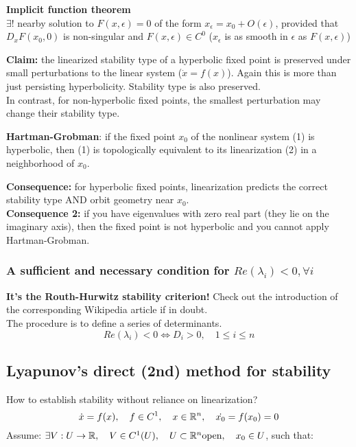  \begin{theorem}
 \textbf{Implicit function theorem}\\
 $\exists !$ nearby solution to $F(x,\epsilon)=0$ of the form  $x_{\epsilon}=x_0+O(\epsilon)$, provided that $D_xF(x_0, 0)$ is non-singular and $F(x,\epsilon)\in C^0$ ($x_{\epsilon}$ is as smooth in $\epsilon$ as $F(x,\epsilon)$) 
 \end{theorem}
 
 \textbf{Claim:} the linearized stability type of a hyperbolic fixed point is preserved under small perturbations to the linear system ($\dot{x}=f(x)$). Again this is more than just persisting hyperbolicity. Stability type is also preserved.\\
 In contrast, for non-hyperbolic fixed points, the smallest perturbation may change their stability type.
 
 \begin{theorem}
 \textbf{Hartman-Grobman}: if the fixed point $x_0$ of the nonlinear system (1) is hyperbolic, then (1) is topologically equivalent to its linearization (2) in a neighborhood of $x_0$.
 \end{theorem}
 \textbf{Consequence:} for hyperbolic fixed points, linearization predicts the correct stability type AND orbit geometry near $x_0$.\\
 
 \textbf{Consequence 2:} if you have eigenvalues with zero real part (they lie on the imaginary axis), then the fixed point is not hyperbolic and you cannot apply Hartman-Grobman.
 
 \subsubsection{A sufficient and necessary condition for $Re(\lambda_i) <0, \forall i$}
 \textbf{It's the Routh-Hurwitz stability criterion!} Check out the introduction of the corresponding Wikipedia article if in doubt.\\
 The procedure is to define a series of determinants.
 $$Re(\lambda_i)<0 \iff D_i>0, \quad 1\leq i\leq n$$
 
 \subsection{Lyapunov's direct (2nd) method for stability}

How to establish stability without reliance on linearization?
$$\dot{x}=f(x), \quad f\in C^1, \quad x \in \mathbb{R}^n, \quad \dot{x_0}=f(x_0)=0$$
Assume: $\exists V: U \to \mathbb{R}, \quad V \in C^1(U), \quad U \subset \mathbb{R}^n \text{open}, \quad x_0 \in U$, such that:

